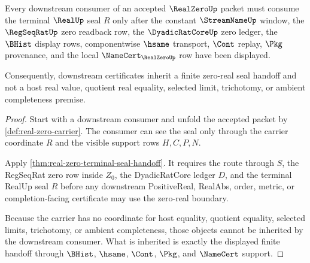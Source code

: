 \begin{theorem}
\label{thm:real-zero-downstream-consumer-obligation}
Every downstream consumer of an accepted $\RealZeroUp$ packet must consume the terminal $\RealUp$ seal $R$ only after the constant $\StreamNameUp$ window, the $\RegSeqRatUp$ zero readback row, the $\DyadicRatCoreUp$ zero ledger, the $\BHist$ display rows, componentwise $\hsame$ transport, $\Cont$ replay, $\Pkg$ provenance, and the local $\NameCert_{\RealZeroUp}$ row have been displayed.

Consequently, downstream certificates inherit a finite zero-real seal handoff and not a host real value, quotient real equality, selected limit, trichotomy, or ambient completeness premise.
\end{theorem}
\begin{proof}
Start with a downstream consumer and unfold the accepted packet by \autoref{def:real-zero-carrier}. The consumer can see the seal only through the carrier coordinate $R$ and the visible support rows $H,C,P,N$.

Apply \autoref{thm:real-zero-terminal-seal-handoff}. It requires the route through $S$, the RegSeqRat zero row inside $Z_0$, the DyadicRatCore ledger $D$, and the terminal RealUp seal $R$ before any downstream PositiveReal, RealAbs, order, metric, or completion-facing certificate may use the zero-real boundary.

Because the carrier has no coordinate for host equality, quotient equality, selected limits, trichotomy, or ambient completeness, those objects cannot be inherited by the downstream consumer. What is inherited is exactly the displayed finite handoff through $\BHist$, $\hsame$, $\Cont$, $\Pkg$, and $\NameCert$ support.
\end{proof}

